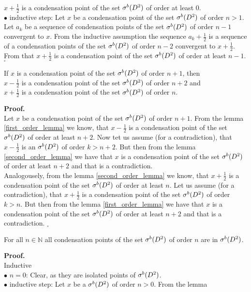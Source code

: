 $x + \frac{1}{2}$ is a condensation point of the set ${\mathcal{\sigma}^b(D^2)}$ of order at least $0$. \\
$\bullet$ inductive step: Let $x$ be a condensation point of the set ${\mathcal{\sigma}^b(D^2)}$ of order $n > 1$. 
Let $a_k$ be a sequence of condensation points of the set ${\mathcal{\sigma}^b(D^2)}$ of order $n-1$ convergent to $x$. 
From the inductive assumption the sequence $a_k + \frac{1}{2}$ is a sequence of a condensation
 points of the set ${\mathcal{\sigma}^b(D^2)}$ of order $n-2$ convergent to $x + \frac{1}{2}$. From that 
 $x + \frac{1}{2}$ is a condensation point of the set ${\mathcal{\sigma}^b(D^2)}$ of order at least $n-1$. $_\square$ 
\begin{lemma}\label{third_order_lemma}
If $x$ is a condensation point of the set ${\mathcal{\sigma}^b(D^2)}$ of order $n+1$, then \\
$x - \frac{1}{2}$ is a condensation point of the set ${\mathcal{\sigma}^b(D^2)}$ of order $n+2$ and \\
$x + \frac{1}{2}$ is a condensation point of the set ${\mathcal{\sigma}^b(D^2)}$ of order $n$. 
\end{lemma}
\noindent\textbf{Proof.} \\
Let $x$ be a condensation point of the set ${\mathcal{\sigma}^b(D^2)}$ of order $n+1$. From the lemma 
 \ref{first_order_lemma} we know, that $x - \frac{1}{2}$ is a condensation point of the set 
 ${\mathcal{\sigma}^b(D^2)}$ of order at least $n+2$. Now tet us assume (for a contradiction), that $x - \frac{1}{2}$ 
 is an \cpots ${\mathcal{\sigma}^b(D^2)}$ of order $k>n+2$. But then from the lemma \ref{second_order_lemma} 
 we have that $x$ is a condensation point of the set ${\mathcal{\sigma}^b(D^2)}$ of order at least $n+2$ and that 
 is a contradiction. \\
Analogousely, from the lemma \ref{second_order_lemma} we know, that $x + \frac{1}{2}$ is a 
condensation point of the set ${\mathcal{\sigma}^b(D^2)}$ of order at least $n$. Let us assume (for a contradiction), 
that $x+ \frac{1}{2}$ is a condensation point of the set ${\mathcal{\sigma}^b(D^2)}$ of order $k>n$. But then 
from the lemma \ref{first_order_lemma} we have that $x$ is a condensation point of the set ${\mathcal{\sigma}^b(D^2)}$ 
of order at least $n+2$ and that is a contradiction. $_\square$ 
\begin{lemma}\label{condensations_points_of_the_set}
For all $n \in \mathbb{N}$ all condensation points of the set ${\mathcal{\sigma}^b(D^2)}$ of order $n$ are in ${\mathcal{\sigma}^b(D^2)}$.
\end{lemma}
\noindent\textbf{Proof.} \\
Inductive \\
$\bullet$ $n=0$: Clear, as they are isolated points of ${\mathcal{\sigma}^b(D^2)}$. \\
$\bullet$ inductive step: Let $x$ be a \cpots  ${\mathcal{\sigma}^b(D^2)}$ of order $n>0$. From the lemma 
